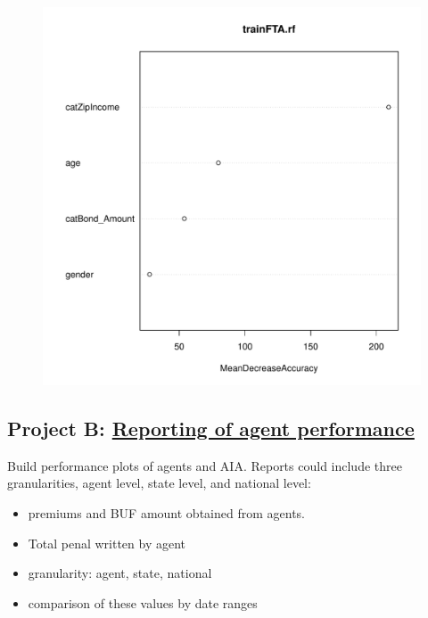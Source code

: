 \documentclass{article}
\begin{document}
\begin{figure}[H]
\centering
\includegraphics[width=0.45\paperwidth,page=3]{varPlot.pdf}
\end{figure}
 

\subsection{Project B: \underline{Reporting of agent performance}}

Build performance plots of agents and AIA. Reports could include three granularities, agent level, state level, and national level: 
\begin{itemize}
\item premiums and BUF amount obtained from agents. 
\item Total penal written by agent
\item granularity: agent, state, national
\item comparison of these values by date ranges
\end{itemize}

\end{document}
